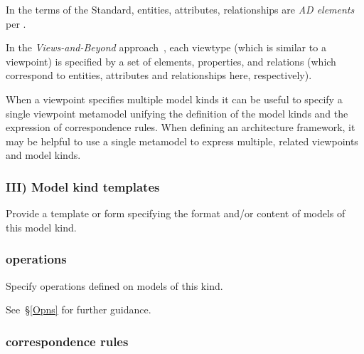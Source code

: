 
In the terms of the Standard, entities, attributes, relationships are
\textit{AD elements} per .

In the \textit{Views-and-Beyond} approach~\cite{DSA:2010}, each
viewtype (which is similar to a viewpoint) is specified by a set of
elements, properties, and relations (which correspond to entities,
attributes and relationships here, respectively).

When a viewpoint specifies multiple model kinds it can be useful to
specify a single viewpoint metamodel unifying the definition of the
model kinds and the expression of correspondence rules.  When defining
an architecture framework, it may be helpful to use a single metamodel
to express multiple, related viewpoints and model kinds.



\subsubsection*{III) Model kind templates \Optional}

Provide a template or form specifying the format and/or content of
models of this model kind.



\subsubsection{ operations \Optional} 

Specify operations defined on models of this kind.

See~\S\ref{Opns} for further guidance.


\subsubsection{ correspondence rules}

